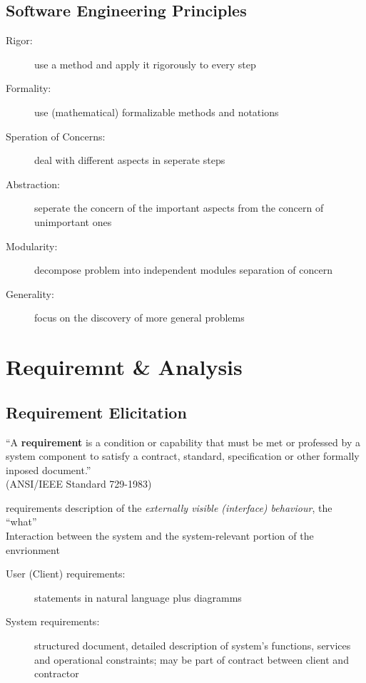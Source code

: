 \documentclass[a4paper, 10pt]{article}
\begin{document}
\subsection{Software Engineering Principles}
\begin{description}
	\item[Rigor:] use a method and apply it rigorously to every step
	\item[Formality:] use (mathematical) formalizable methods and notations
	\item[Speration of Concerns:] deal with different aspects in seperate steps
	\item[Abstraction:] seperate the concern of the important aspects from the concern of unimportant ones
	\item[Modularity:] decompose problem into independent modules \follows separation of concern
	\item[Generality:] focus on the discovery of more general problems
\end{description}

\section{Requiremnt \& Analysis}

\subsection{Requirement Elicitation}
\begin{shaded}
``A \textbf{requirement} is a condition or capability that must be met or professed by a system component to satisfy a contract, standard, specification or other formally inposed document.'' \\
(ANSI/IEEE Standard 729-1983)
\end{shaded}
requirements \follows description of the \emph{externally visible (interface) behaviour}, the ``what''\\
Interaction between the system and the system-relevant portion of the envrionment

\begin{description}
	\item[User (Client) requirements:] statements in natural language plus diagramms
	\item[System requirements:] structured document, detailed description of system's functions, services and operational constraints; may be part of contract between client and contractor
\end{description}
\end{document}
